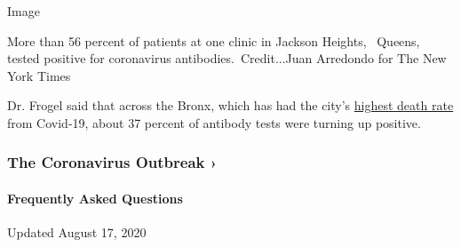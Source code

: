 Image

More than 56 percent of patients at one clinic in Jackson Heights,~
Queens, tested positive for coronavirus antibodies.~Credit...Juan
Arredondo for The New York Times

Dr. Frogel said that across the Bronx, which has had the city's
\href{https://www1.nyc.gov/site/doh/covid/covid-19-data-deaths.page}{highest
death rate} from Covid-19, about 37 percent of antibody tests were
turning up positive.

\href{https://www.nytimes3xbfgragh.onion/news-event/coronavirus?action=click\&pgtype=Article\&state=default\&region=MAIN_CONTENT_3\&context=storylines_faq}{}

\hypertarget{the-coronavirus-outbreak-}{%
\subsubsection{The Coronavirus Outbreak
›}\label{the-coronavirus-outbreak-}}

\hypertarget{frequently-asked-questions}{%
\paragraph{Frequently Asked
Questions}\label{frequently-asked-questions}}

Updated August 17, 2020

